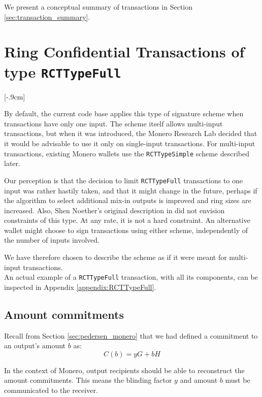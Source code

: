 We present a conceptual summary of transactions in Section \ref{sec:transaction_summary}.

\newpage
\section{Ring Confidential Transactions of type {\tt RCTTypeFull}}[-.9cm]
\label{sec:RCTTypeFull}

By default, the current code base applies this type of signature scheme when transactions have only one input. The scheme itself allows multi-input transactions, but when it was introduced, the Monero Research Lab decided that it would be advisable to use it only on single-input transactions. For multi-input transactions, existing Monero wallets use the {\tt RCTTypeSimple} scheme described later.

Our perception is that the decision to limit {\tt RCTTypeFull} transactions to one input was rather hastily taken, and that it might change in the future, perhaps if the algorithm to select additional mix-in outputs is improved and ring sizes are increased. Also, Shen Noether’s original description in \cite{MRL-0005} did not envision constraints of this type. At any rate, it is not a hard constraint. An alternative wallet might choose to sign transactions using either scheme, independently of the number of inputs involved.

We have therefore chosen to describe the scheme as if it were meant for multi-input transactions.
\\

An actual example of a {\tt RCTTypeFull} transaction, with all its components, can be inspected in Appendix \ref{appendix:RCTTypeFull}.


\subsection{Amount commitments}
\label{amount-commitments}
Recall from Section \ref{sec:pedersen_monero} that we had defined a commitment to an output’s amount $b$ as: \vspace{.2cm}
\[C(b) = y G + b H\]

In the context of Monero, output recipients should be able to reconstruct the amount commitments. This means the blinding factor $y$ and amount $b$ must be communicated to the receiver.

